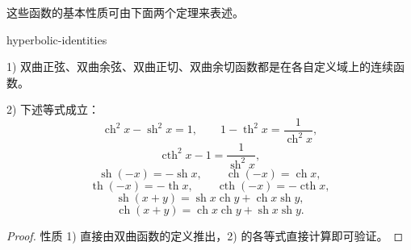这些函数的基本性质可由下面两个定理来表述。

\begin{mythm}{}{hyperbolic-identities}

	1) 双曲正弦、双曲余弦、双曲正切、双曲余切函数都是在各自定义域上的连续函数。

	2) 下述等式成立：
	\[
	\operatorname{ch}^2x-\operatorname{sh}^2x=1,\qquad 1-\operatorname{th}^2x=\frac1{\operatorname{ch}^2x},
	\]
	\[
	\operatorname{cth}^2x-1=\frac1{\operatorname{sh}^2x},
	\]
	\[
	\operatorname{sh}(-x)=-\operatorname{sh}x,\qquad\operatorname{ch}(-x)=\operatorname{ch}x,
	\]
	\[
	\operatorname{th}(-x)=-\operatorname{th}x,\qquad\operatorname{cth}(-x)=-\operatorname{cth}x,
	\]
	\[
	\operatorname{sh}(x+y)=\operatorname{sh}x\operatorname{ch}y+\operatorname{ch}x\operatorname{sh}y,
	\]
	\[
	\operatorname{ch}(x+y)=\operatorname{ch}x\operatorname{ch}y+\operatorname{sh}x\operatorname{sh}y.
	\]

\end{mythm}

\begin{proof}

	性质 1) 直接由双曲函数的定义推出，2) 的各等式直接计算即可验证。

\end{proof}

